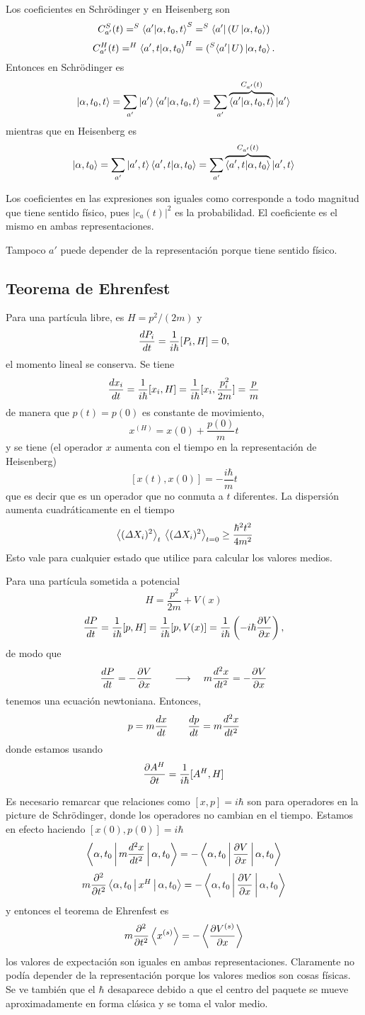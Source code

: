 \documentclass[10pt,oneside]{CBFT_book}
\begin{document}
Los coeficientes en Schrödinger y en Heisenberg son 
\[
	C_{a'}^S(t) = ^S\braket{a'|\alpha,t_0,t}^S = ^S\Bra{a'}(U\Ket{\alpha,t_0}) 
\]	
\[	
	C_{a'}^H(t) = ^H\braket{a',t|\alpha,t_0}^H = (^S\Bra{a'}U)\Ket{\alpha,t_0}.
\]
Entonces en Schrödinger es 
\[
	\Ket{\alpha,t_0,t} = \sum_{a'} \Ket{a'}\braket{a'|\alpha,t_0,t} = 
	\sum_{a'} \overbrace{\braket{a'|\alpha,t_0,t}}^{C_{a'}(t)}\Ket{a'}
\]
mientras que en Heisenberg es 
\[
	\Ket{\alpha,t_0} = \sum_{a'} \Ket{a',t}\braket{a',t|\alpha,t_0} = 
	\sum_{a'} \overbrace{\braket{a',t|\alpha,t_0}}^{C_{a'}(t)}\Ket{a',t}
\]

Los coeficientes en las expresiones son iguales como corresponde a todo magnitud 
que tiene sentido físico, pues $|c_a(t)|^2$ es la probabilidad.
El coeficiente es el mismo en ambas representaciones.

Tampoco $a'$ puede depender de la representación porque tiene sentido físico.

\subsection{Teorema de Ehrenfest}

Para una partícula libre, es $H = p^2 / (2m) $ y
\[
	\dtot{P_i}{t} = \frac{1}{i\hbar} [ P_i, H ] = 0,
\]
el momento lineal se conserva. Se tiene
\[
	\dtot{x_i}{t} =  \frac{1}{i\hbar} [ x_i, H ] =
	\frac{1}{i\hbar} [ x_i, \frac{p^2_i}{2m} ] = \frac{p}{m}
\]
de manera que $p(t)=p(0)$ es constante de movimiento,
\[
	x^{(H)} = x(0) + \frac{p(0)}{m}t
\]
y se tiene (el operador $x$ aumenta con el tiempo en la representación de Heisenberg)
\[
	[x(t),x(0)] = -\frac{i\hbar}{m}t
\]
que es decir que es un operador que no conmuta a $t$ diferentes. La dispersión
aumenta cuadráticamente en el tiempo
\[
	\vm{ (\Delta X_i)^2 }_t \vm{ (\Delta X_i)^2 }_{t=0} \geq \frac{\hbar^2 t^2}{4 m^2}
\]
Esto vale para cualquier estado que utilice para calcular los valores medios.


Para una partícula sometida a potencial
\[
	H = \frac{p^2}{2m} + V(x)
\]
\[
	\dtot{P}{t} = \frac{1}{i\hbar}[p,H] = \frac{1}{i\hbar}[p,V(x)] = 
	\frac{1}{i\hbar}\left( -i\hbar\dpar{V}{x}\right),
\]
de modo que 
\[
	\dtot{P}{t} = -\dpar{V}{x} \qquad \longrightarrow \quad m \dtot[2]{x}{t} = -\dpar{V}{x} 
\]
tenemos una ecuación newtoniana. Entonces,
\[
	p = m \dtot{x}{t} \qquad \dtot{p}{t} = m \dtot[2]{x}{t} 
\]
donde estamos usando 
\[
	\dpar{A^H}{t} = \frac{1}{i\hbar}[A^H,H]
\]

Es necesario remarcar que relaciones como $[x,p]=i\hbar$ son para operadores en la picture de Schrödinger,
donde los operadores no cambian en el tiempo. Estamos en efecto haciendo $[x(0),p(0)]=i\hbar$
\[
	\Braket{\alpha,t_0|m \dtot[2]{x}{t}|\alpha,t_0} = - \Braket{\alpha,t_0|\dpar{V}{x}|\alpha,t_0}
\]
\[
	m\dpar[2]{}{t}\Braket{\alpha,t_0| x^H |\alpha,t_0} = -\Braket{\alpha,t_0|\dpar{V}{x}|\alpha,t_0}
\]
y entonces el teorema de Ehrenfest es 
\[
	m \dpar[2]{}{t} \Braket{x^{(s)}} = - \Braket{ \dpar{V^{(s)}}{x}}
\]
los valores de expectación son iguales en ambas representaciones.
Claramente no podía depender de la representación porque los valores medios son cosas físicas.
Se ve también que el $\hbar$ desaparece debido a que el centro del paquete se mueve 
aproximadamente en forma clásica y se toma el valor medio.
\end{document}
